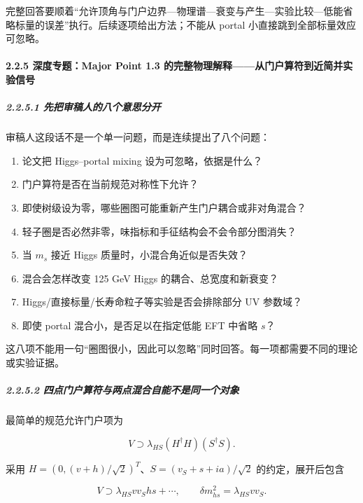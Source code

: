 \documentclass[
  chinese,
  UTF8]{ctexart}
\providecommand{\tightlist}{%
  \setlength{\itemsep}{0pt}\setlength{\parskip}{0pt}}
\begin{document}
完整回答要顺着``允许顶角与门户边界---物理谱---衰变与产生---实验比较---低能省略标量的误差''执行。后续逐项给出方法；不能从
portal 小直接跳到全部标量效应可忽略。

\paragraph{2.2.5 深度专题：Major Point 1.3
的完整物理解释------从门户算符到近简并实验信号}\label{ux6df1ux5ea6ux4e13ux9898major-point-1.3-ux7684ux5b8cux6574ux7269ux7406ux89e3ux91caux4eceux95e8ux6237ux7b97ux7b26ux5230ux8fd1ux7b80ux5e76ux5b9eux9a8cux4fe1ux53f7}

\subparagraph{2.2.5.1
先把审稿人的八个意思分开}\label{ux5148ux628aux5ba1ux7a3fux4ebaux7684ux516bux4e2aux610fux601dux5206ux5f00}

审稿人这段话不是一个单一问题，而是连续提出了八个问题：

\begin{enumerate}
\def\labelenumi{\arabic{enumi}.}
\tightlist
\item
  论文把 Higgs--portal mixing 设为可忽略，依据是什么？
\item
  门户算符是否在当前规范对称性下允许？
\item
  即使树级设为零，哪些圈图可能重新产生门户耦合或非对角混合？
\item
  轻子圈是否必然非零，味指标和手征结构会不会令部分图消失？
\item
  当 \(m_s\) 接近 Higgs 质量时，小混合角近似是否失效？
\item
  混合会怎样改变 125 GeV Higgs 的耦合、总宽度和新衰变？
\item
  Higgs/直接标量/长寿命粒子等实验是否会排除部分 UV 参数域？
\item
  即使 portal 混合小，是否足以在指定低能 EFT 中省略 \(s\)？
\end{enumerate}

这八项不能用一句``圈图很小，因此可以忽略''同时回答。每一项都需要不同的理论或实验证据。

\subparagraph{2.2.5.2
四点门户算符与两点混合自能不是同一个对象}\label{ux56dbux70b9ux95e8ux6237ux7b97ux7b26ux4e0eux4e24ux70b9ux6df7ux5408ux81eaux80fdux4e0dux662fux540cux4e00ux4e2aux5bf9ux8c61}

最简单的规范允许门户项为

\[V\supset\lambda_{HS}(H^\dagger H)(S^\dagger S).\]

采用 \(H=(0,(v+h)/\sqrt2)^T\)、\(S=(v_S+s+ia)/\sqrt2\)
的约定，展开后包含

\[V\supset\lambda_{HS}vv_S hs+\cdots,\qquad \delta m_{hs}^2=\lambda_{HS}vv_S.\]
\end{document}
